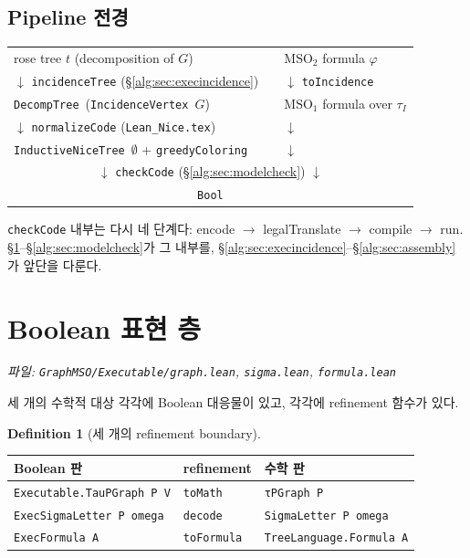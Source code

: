 \documentclass[11pt]{article}
\theoremstyle{definition}
\newtheorem{definition}{Definition}[section]
\theoremstyle{plain}
\newcommand{\MSO}{\mathrm{MSO}}
\newcommand{\MSOtwo}{\mathrm{MSO}_2}
\newcommand{\lean}[1]{\texttt{#1}}
\newcommand{\leanfile}[1]{\texttt{#1}}
\begin{document}
\subsection{Pipeline 전경}

\begin{center}
\begin{tabular}{lcl}
rose tree $t$ (decomposition of $G$) & \quad & $\MSOtwo$ formula $\varphi$ \\
$\downarrow$ \lean{incidenceTree} (\S\ref{alg:sec:execincidence}) & & $\downarrow$ \lean{toIncidence} \\
\lean{DecompTree}\ (\lean{IncidenceVertex}\ $G$) & & $\MSO_1$ formula over $\tau_I$ \\
$\downarrow$ \lean{normalizeCode} (\leanfile{Lean\_Nice.tex}) & & $\downarrow$ \\
\lean{InductiveNiceTree}\ $\emptyset$ \quad + \quad \lean{greedyColoring} & & $\downarrow$ \\
\multicolumn{3}{c}{$\downarrow$ \qquad \lean{checkCode} (\S\ref{alg:sec:modelcheck}) \qquad $\downarrow$} \\
\multicolumn{3}{c}{\lean{Bool}} \\
\end{tabular}
\end{center}

\lean{checkCode} 내부는 다시 네 단계다: encode $\to$ legalTranslate $\to$
compile $\to$ run. \S\ref{alg:sec:boolean}--\S\ref{alg:sec:modelcheck}가
그 내부를, \S\ref{alg:sec:execincidence}--\S\ref{alg:sec:assembly}가 앞단을
다룬다.

\section{Boolean 표현 층}
\label{alg:sec:boolean}

\emph{파일: \leanfile{GraphMSO/Executable/graph.lean},
\leanfile{sigma.lean}, \leanfile{formula.lean}}

세 개의 수학적 대상 각각에 Boolean 대응물이 있고, 각각에 refinement 함수가
있다.

\begin{definition}[세 개의 refinement boundary]
\label{alg:def:refinements}
\begin{center}
\begin{tabular}{lll}
\hline
Boolean 판 & refinement & 수학 판 \\
\hline
\lean{Executable.TauPGraph P V} & \lean{toMath} & \lean{τPGraph P} \\
\lean{ExecSigmaLetter P omega} & \lean{decode} & \lean{SigmaLetter P omega} \\
\lean{ExecFormula A} & \lean{toFormula} & \lean{TreeLanguage.Formula A} \\
\hline
\end{tabular}
\end{center}
\end{definition}
\end{document}
